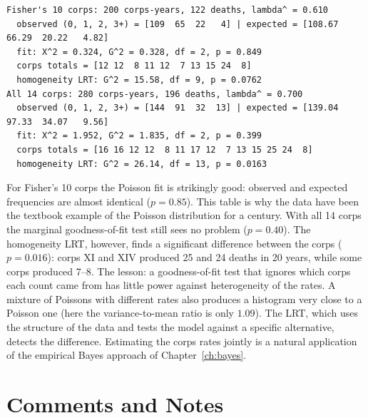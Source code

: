 \documentclass[main.tex]{subfiles}
\begin{document}
\begin{lstlisting}[style=output]
Fisher's 10 corps: 200 corps-years, 122 deaths, lambda^ = 0.610
  observed (0, 1, 2, 3+) = [109  65  22   4] | expected = [108.67  66.29  20.22   4.82]
  fit: X^2 = 0.324, G^2 = 0.328, df = 2, p = 0.849
  corps totals = [12 12  8 11 12  7 13 15 24  8]
  homogeneity LRT: G^2 = 15.58, df = 9, p = 0.0762
All 14 corps: 280 corps-years, 196 deaths, lambda^ = 0.700
  observed (0, 1, 2, 3+) = [144  91  32  13] | expected = [139.04  97.33  34.07   9.56]
  fit: X^2 = 1.952, G^2 = 1.835, df = 2, p = 0.399
  corps totals = [16 16 12 12  8 11 17 12  7 13 15 25 24  8]
  homogeneity LRT: G^2 = 26.14, df = 13, p = 0.0163
\end{lstlisting}

For Fisher's 10 corps the Poisson fit is strikingly good: observed and expected frequencies are almost identical ($p=0.85$). This table is why the data have been the textbook example of the Poisson distribution for a century. With all 14 corps the marginal goodness-of-fit test still sees no problem ($p=0.40$). The homogeneity LRT, however, finds a significant difference between the corps ($p=0.016$): corps XI and XIV produced 25 and 24 deaths in 20 years, while some corps produced 7--8. The lesson: a goodness-of-fit test that ignores which corps each count came from has little power against heterogeneity of the rates. A mixture of Poissons with different rates also produces a histogram very close to a Poisson one (here the variance-to-mean ratio is only $1.09$). The LRT, which uses the structure of the data and tests the model against a specific alternative, detects the difference. Estimating the corps rates jointly is a natural application of the empirical Bayes approach of Chapter~\ref{ch:bayes}.

\section{Comments and Notes}
\end{document}
